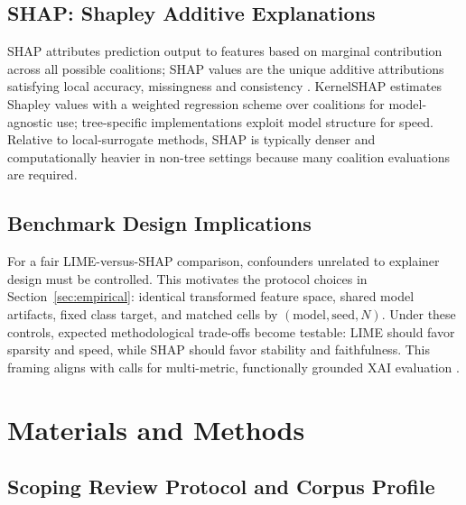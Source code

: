 \documentclass[fleqn,10pt,lineno]{wlpeerj}
\begin{document}
\subsection{SHAP: Shapley Additive Explanations}

SHAP attributes prediction output to features based on marginal
contribution across all possible coalitions; SHAP values are the unique
additive attributions satisfying local accuracy, missingness and consistency
\citep{lundberg2017unified}. KernelSHAP
estimates Shapley values with a weighted regression scheme over coalitions
for model-agnostic use; tree-specific implementations exploit model
structure for speed. Relative to local-surrogate methods, SHAP is
typically denser and computationally heavier in non-tree settings because
many coalition evaluations are required.

\subsection{Benchmark Design Implications}

For a fair LIME-versus-SHAP comparison, confounders unrelated to explainer
design must be controlled. This motivates the protocol choices in
Section~\ref{sec:empirical}: identical transformed feature space, shared
model artifacts, fixed class target, and matched cells by
$(\mathrm{model}, \mathrm{seed}, N)$. Under these controls, expected
methodological trade-offs become testable: LIME should favor sparsity and
speed, while SHAP should favor stability and faithfulness. This framing
aligns with calls for multi-metric, functionally grounded XAI evaluation
\citep{pawlicki2024metrics,canha2025benchmark}.



\section{Materials and Methods}
\label{sec:methods}


\subsection{Scoping Review Protocol and Corpus Profile}
\label{sec:scoping}
\end{document}
